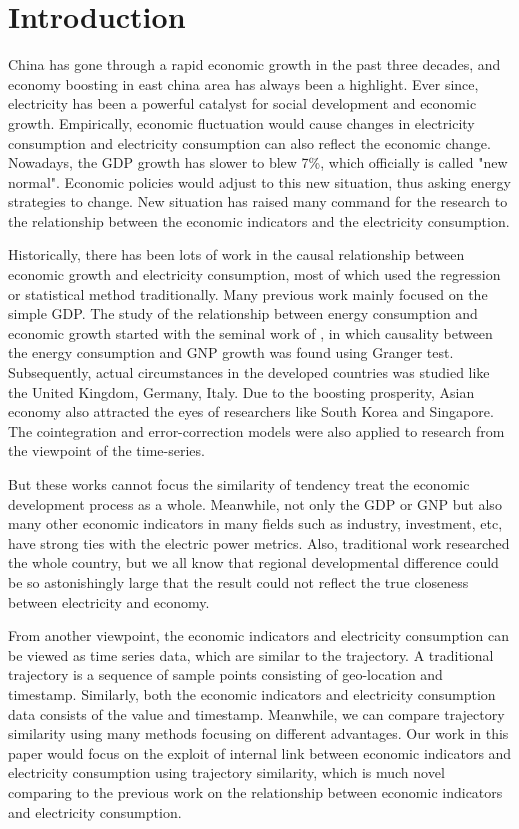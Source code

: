 
\section{Introduction}
China has gone through a rapid economic growth in the past three decades, and economy boosting in east china area has always been a highlight. Ever since, electricity has been a powerful catalyst for social development and economic growth. Empirically, economic fluctuation would cause changes in electricity consumption and electricity consumption can also reflect the economic change. Nowadays, the GDP growth has slower to blew 7\%, which officially is called "new normal". Economic policies would adjust to this new situation, thus asking energy strategies to change. New situation has raised many command for the research to the relationship between the economic indicators and the electricity consumption. 

Historically, there has been lots of work in the causal relationship between economic growth and electricity consumption, most of which used the regression or statistical method traditionally. Many previous work mainly focused on the simple GDP. The study of the relationship between energy consumption and economic growth started with the seminal work of \cite{kraft:relationship}, in which causality between the energy consumption and GNP growth was found using Granger test. Subsequently, actual circumstances in the developed countries was studied like the United Kingdom, Germany, Italy\cite{yu:causal, erol1987causal}. Due to the boosting prosperity, Asian economy also attracted the eyes of researchers like South Korea and Singapore. The cointegration and error-correction models were also applied to research from the viewpoint of the time-series\cite{glasure1998cointegration}.

But these works cannot focus the similarity of tendency treat the economic development process as a whole. Meanwhile, not only the GDP or GNP but also many other economic indicators in many fields such as industry, investment, etc, have strong ties with the electric power metrics. Also, traditional work researched the whole country, but we all know that regional developmental difference could be so astonishingly large that the result could not reflect the true closeness between electricity and economy.  

From another viewpoint, the economic indicators and electricity consumption can be viewed as time series data, which are similar to the trajectory. A traditional trajectory is a sequence of sample points consisting of geo-location and timestamp. Similarly, both the economic indicators and electricity consumption data consists of the value and timestamp. Meanwhile, we can compare trajectory similarity using many methods focusing on different advantages. Our work in this paper would focus on the exploit of internal link between economic indicators and electricity consumption using trajectory similarity, which is much novel comparing to the previous work on the relationship between economic indicators and electricity consumption. 

